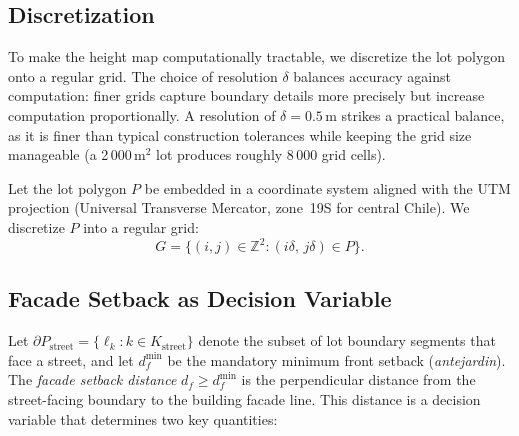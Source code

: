 \documentclass[11pt,a4paper]{article}
\newcommand{\Z}{\mathbb{Z}}
\begin{document}
\subsection{Discretization}

To make the height map computationally tractable, we discretize the lot
polygon onto a regular grid. The choice of resolution $\delta$ balances
accuracy against computation: finer grids capture boundary details more
precisely but increase computation proportionally. A resolution of
$\delta = 0.5$\,m strikes a practical balance, as it is finer than
typical construction tolerances while keeping the grid size manageable
(a 2\,000\,m$^2$ lot produces roughly 8\,000 grid cells).

Let the lot polygon $P$ be embedded in a coordinate system aligned with the
UTM projection (Universal Transverse Mercator, zone~19S for central Chile).
We discretize $P$ into a regular grid:
\[
    G = \bigl\{(i,j) \in \Z^2 : (i\delta, \, j\delta) \in P \bigr\}.
\]

\subsection{Facade Setback as Decision Variable}

Let $\partial P_{\text{street}} = \{\ell_k : k \in K_{\text{street}}\}$
denote the subset of lot boundary segments that face a street, and let
$d_f^{\min}$ be the mandatory minimum front setback (\emph{antejardin}).
The \emph{facade setback distance} $d_f \geq d_f^{\min}$ is the
perpendicular distance from the street-facing boundary to the building
facade line. This distance is a decision variable that determines two
key quantities:
\end{document}
